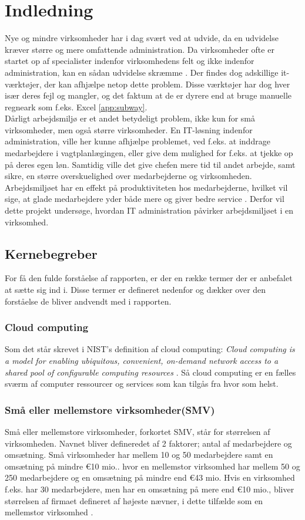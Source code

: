 \chapter{Indledning}
Nye og mindre virksomheder har i dag svært ved at udvide, da en udvidelse kræver større og mere omfattende administration. Da virksomheder ofte er startet op af specialister indenfor virksomhedens felt og ikke indenfor administration, kan en sådan udvidelse skræmme \citep{SmaaFirmaerOrker}. Der findes dog adskillige it-værktøjer, der kan afhjælpe netop dette problem. Disse værktøjer har dog hver især deres fejl og mangler, og det faktum at de er dyrere end at bruge manuelle regneark som f.eks. Excel \citep{Play}\ref{app:subway}.\\
Dårligt arbejdsmiljø er et andet betydeligt problem, ikke kun for små virksomheder, men også større virksomheder. En IT-løsning indenfor administration, ville her kunne afhjælpe problemet, ved f.eks. at inddrage medarbejdere i vagtplanlægingen, eller give dem mulighed for f.eks. at tjekke op på deres egen løn. Samtidig ville det give chefen mere tid til andet arbejde, samt sikre, en større overskuelighed over medarbejderne og virksomheden. 
Arbejdsmiljøet har en effekt på produktiviteten hos medarbejderne, hvilket vil sige, at glade medarbejdere yder både mere og giver bedre service \citep{Jensen2014}. Derfor vil dette projekt undersøge, hvordan IT administration påvirker arbejdsmiljøet i en virksomhed.

\section{Kernebegreber}
For få den fulde forståelse af rapporten, er der en række termer der er anbefalet at sætte sig ind i. Disse termer er defineret nedenfor og dækker over den forståelse de bliver andvendt med i rapporten. 
\subsection{Cloud computing}
Som det står skrevet i NIST’s definition af cloud computing: \textit{Cloud computing is a model for enabling ubiquitous, convenient, on-demand network access to a shared pool of configurable computing resources} \citep{cloud_def}. Så cloud computing er en fælles sværm af computer ressourcer og services som kan tilgås fra hvor som helst.

\subsection{Små eller mellemstore virksomheder(SMV)}
Små eller mellemstore virksomheder, forkortet SMV, står for størrelsen af virksomheden. Navnet bliver defineredet af 2 faktorer; antal af medarbejdere og omsætning. Små virksomheder har mellem 10 og 50 medarbejdere samt en omsætning på mindre \euro 10 mio.. hvor en mellemstor virksomhed har mellem 50 og 250 medarbejdere og en omsætning på mindre end \euro 43 mio. Hvis en virksomhed f.eks. har 30 medarbejdere, men har en omsætning på mere end \euro 10 mio., bliver størrelsen af firmaet defineret af højeste nævner, i dette tilfælde som en mellemstor virksomhed \citep{SMV}.

